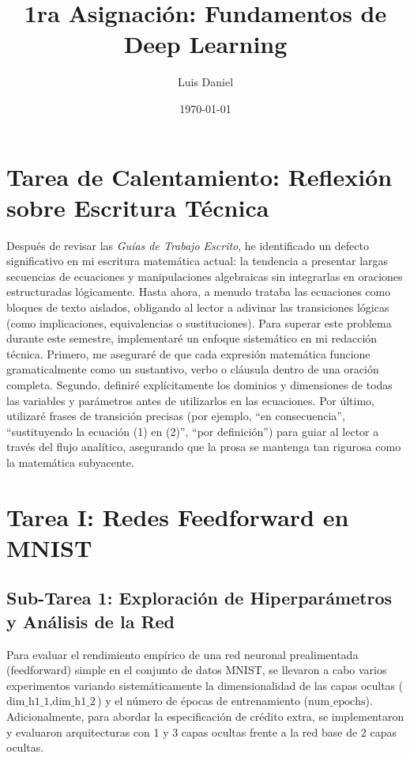 \documentclass[12pt]{article}
\title{1ra Asignación: Fundamentos de Deep Learning}
\author{Luis Daniel}
\date{\today}
\begin{document}
\maketitle

\section*{Tarea de Calentamiento: Reflexión sobre Escritura Técnica}
Después de revisar las \textit{Guías de Trabajo Escrito}, he identificado un defecto significativo en mi escritura matemática actual: la tendencia a presentar largas secuencias de ecuaciones y manipulaciones algebraicas sin integrarlas en oraciones estructuradas lógicamente. Hasta ahora, a menudo trataba las ecuaciones como bloques de texto aislados, obligando al lector a adivinar las transiciones lógicas (como implicaciones, equivalencias o sustituciones). Para superar este problema durante este semestre, implementaré un enfoque sistemático en mi redacción técnica. Primero, me aseguraré de que cada expresión matemática funcione gramaticalmente como un sustantivo, verbo o cláusula dentro de una oración completa. Segundo, definiré explícitamente los dominios y dimensiones de todas las variables y parámetros antes de utilizarlos en las ecuaciones. Por último, utilizaré frases de transición precisas (por ejemplo, ``en consecuencia'', ``sustituyendo la ecuación (1) en (2)'', ``por definición'') para guiar al lector a través del flujo analítico, asegurando que la prosa se mantenga tan rigurosa como la matemática subyacente.

\section*{Tarea I: Redes Feedforward en MNIST}

\subsection*{Sub-Tarea 1: Exploración de Hiperparámetros y Análisis de la Red}
Para evaluar el rendimiento empírico de una red neuronal prealimentada (feedforward) simple en el conjunto de datos MNIST, se llevaron a cabo varios experimentos variando sistemáticamente la dimensionalidad de las capas ocultas ($\text{dim\_h1\_1}, \text{dim\_h1\_2}$) y el número de épocas de entrenamiento ($\text{num\_epochs}$). Adicionalmente, para abordar la especificación de crédito extra, se implementaron y evaluaron arquitecturas con 1 y 3 capas ocultas frente a la red base de 2 capas ocultas. 
\end{document}
